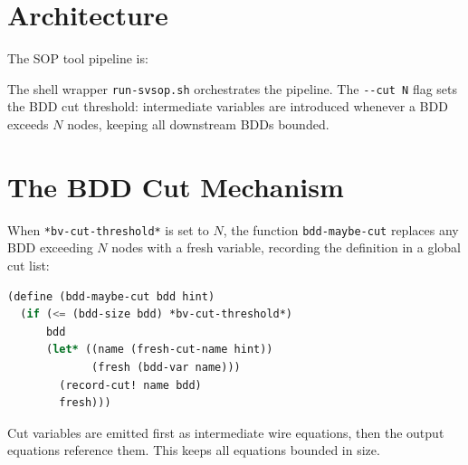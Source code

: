 \documentclass[11pt]{article}
\begin{document}
\section{Architecture}

The SOP tool pipeline is:

\begin{center}
\end{center}

The shell wrapper \texttt{run-svsop.sh} orchestrates the pipeline.
The \texttt{-{}-cut~N} flag sets the BDD cut threshold: intermediate
variables are introduced whenever a BDD exceeds $N$ nodes, keeping all
downstream BDDs bounded.

\section{The BDD Cut Mechanism}

When \texttt{*bv-cut-threshold*} is set to $N$, the function
\texttt{bdd-maybe-cut} replaces any BDD exceeding $N$ nodes with a
fresh variable, recording the definition in a global cut list:

\begin{lstlisting}[language=Lisp]
(define (bdd-maybe-cut bdd hint)
  (if (<= (bdd-size bdd) *bv-cut-threshold*)
      bdd
      (let* ((name (fresh-cut-name hint))
             (fresh (bdd-var name)))
        (record-cut! name bdd)
        fresh)))
\end{lstlisting}

Cut variables are emitted first as intermediate wire equations, then
the output equations reference them.  This keeps all equations bounded
in size.
\end{document}
